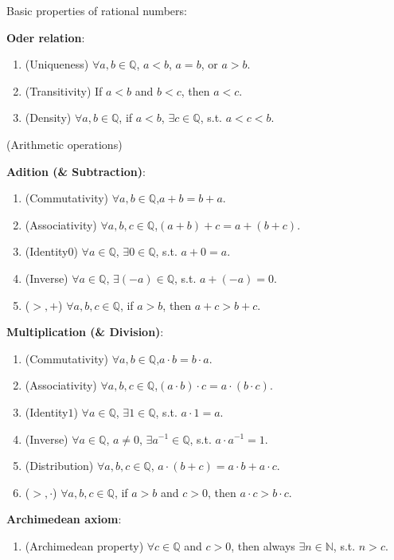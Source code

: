 \documentclass{Math_Note}
\begin{document}
\begin{prp}
    Basic properties of rational numbers:
    
    \textbf{Oder relation}:
    \begin{enumerate}[{I}-1.]
        \item (Uniqueness) $\forall a, b\in\mathbb{Q}$, $a<b$, $a=b$, or $a>b$.
        \item (Transitivity) If $a<b$ and $b<c$, then $a<c$.
        \item (Density) $\forall a, b\in\mathbb{Q}$, if $a<b$, $\exists c\in\mathbb{Q}$, s.t. $a<c<b$.
    \end{enumerate}

    (Arithmetic operations)

    \textbf{Adition (\& Subtraction)}:
    \begin{enumerate}[{II}-1.]
        \item (Commutativity) $\forall a, b\in\mathbb{Q}$,$a+b=b+a$.
        \item (Associativity) $\forall a, b, c\in\mathbb{Q}$,$(a+b)+c=a+(b+c)$.
        \item (Identity$0$) $\forall a\in\mathbb{Q}$, $\exists 0\in\mathbb{Q}$, s.t. $a+0=a$.
        \item (Inverse) $\forall a\in\mathbb{Q}$, $\exists (-a)\in\mathbb{Q}$, s.t. $a+(-a)=0$.
        \item ($>, +$) $\forall a, b, c\in\mathbb{Q}$, if $a>b$, then $a+c>b+c$.
    \end{enumerate}

    \textbf{Multiplication (\& Division)}:
    \begin{enumerate}[{III}-1.]
        \item (Commutativity) $\forall a, b\in\mathbb{Q}$,$a\cdot b=b\cdot a$.
        \item (Associativity) $\forall a, b, c\in\mathbb{Q}$,$(a\cdot b)\cdot c=a\cdot(b\cdot c)$.
        \item (Identity$1$) $\forall a\in\mathbb{Q}$, $\exists 1\in\mathbb{Q}$, s.t. $a\cdot 1=a$.
        \item (Inverse) $\forall a\in\mathbb{Q}$, $a\neq 0$, $\exists a^{-1}\in\mathbb{Q}$, s.t. $a\cdot a^{-1}=1$.
        \item (Distribution) $\forall a, b, c\in\mathbb{Q}$, $a\cdot(b+c)=a\cdot b+a\cdot c$.
        \item ($>, \cdot$) $\forall a, b, c\in\mathbb{Q}$, if $a>b$ and $c>0$, then $a\cdot c>b\cdot c$.
    \end{enumerate}

    \textbf{Archimedean axiom}:
    \begin{enumerate}[{IV}-1.]
        \item (Archimedean property) $\forall c\in\mathbb{Q}$ and $c>0$, then always $\exists n\in\mathbb{N}$, s.t. $n>c$.
    \end{enumerate}
\end{prp}
\end{document}
